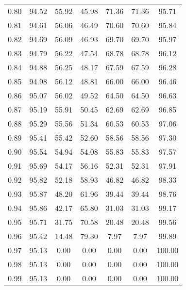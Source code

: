\begin{tabular}{|c|c|c|c|c|c|c|}
      0.80 &     94.52 &     55.92 &      45.98 &   71.36 &      71.36 &         95.71 \\
      0.81 &     94.61 &     56.06 &      46.49 &   70.60 &      70.60 &         95.84 \\
      0.82 &     94.69 &     56.09 &      46.93 &   69.70 &      69.70 &         95.97 \\
      0.83 &     94.79 &     56.22 &      47.54 &   68.78 &      68.78 &         96.12 \\
      0.84 &     94.88 &     56.25 &      48.17 &   67.59 &      67.59 &         96.28 \\
      0.85 &     94.98 &     56.12 &      48.81 &   66.00 &      66.00 &         96.46 \\
      0.86 &     95.07 &     56.02 &      49.52 &   64.50 &      64.50 &         96.63 \\
      0.87 &     95.19 &     55.91 &      50.45 &   62.69 &      62.69 &         96.85 \\
      0.88 &     95.29 &     55.56 &      51.34 &   60.53 &      60.53 &         97.06 \\
      0.89 &     95.41 &     55.42 &      52.60 &   58.56 &      58.56 &         97.30 \\
      0.90 &     95.54 &     54.94 &      54.08 &   55.83 &      55.83 &         97.57 \\
      0.91 &     95.69 &     54.17 &      56.16 &   52.31 &      52.31 &         97.91 \\
      0.92 &     95.82 &     52.18 &      58.93 &   46.82 &      46.82 &         98.33 \\
      0.93 &     95.87 &     48.20 &      61.96 &   39.44 &      39.44 &         98.76 \\
      0.94 &     95.86 &     42.17 &      65.80 &   31.03 &      31.03 &         99.17 \\
      0.95 &     95.71 &     31.75 &      70.58 &   20.48 &      20.48 &         99.56 \\
      0.96 &     95.42 &     14.48 &      79.30 &    7.97 &       7.97 &         99.89 \\
      0.97 &     95.13 &      0.00 &       0.00 &    0.00 &       0.00 &        100.00 \\
      0.98 &     95.13 &      0.00 &       0.00 &    0.00 &       0.00 &        100.00 \\
      0.99 &     95.13 &      0.00 &       0.00 &    0.00 &       0.00 &        100.00 \\
\bottomrule
\end{tabular}

